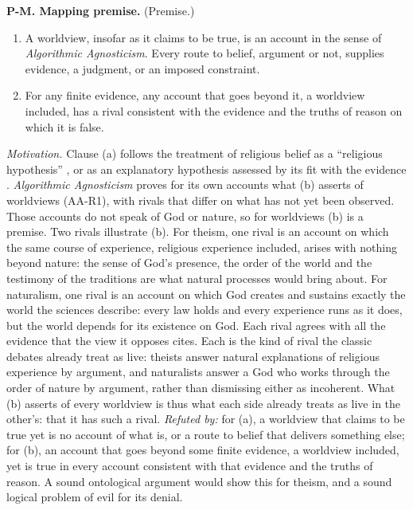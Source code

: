 \medskip\noindent\textbf{P-M. Mapping premise.}\label{item:PM}
(Premise.)
\begin{enumerate}[label=(\alph*)]
  \item A worldview, insofar as it claims to be true, is an account in the sense of
        \emph{Algorithmic Agnosticism}. Every route to belief, argument or not, supplies evidence, a judgment, or an
        imposed constraint.
  \item For any finite evidence, any account that goes beyond it, a worldview included, has a
        rival consistent with the evidence and the truths of reason on which it is false.
\end{enumerate}
\emph{Motivation.} Clause (a) follows the treatment of religious belief as a ``religious
hypothesis'' \citep[§X]{james1896}, or as an explanatory hypothesis assessed by its fit with the
evidence \citep{swinburne2004}. \emph{Algorithmic Agnosticism} proves for its own accounts what (b) asserts of
worldviews (AA-R1), with rivals that differ on what has not yet been observed. Those accounts do
not speak of God or nature, so for worldviews (b) is a premise.
Two rivals illustrate (b). For theism, one rival is an account on which the same course of
experience, religious experience included, arises with nothing beyond nature: the sense of God's
presence, the order of the world and the testimony of the traditions are what natural processes
would bring about. For naturalism, one rival is an account on which God creates and sustains
exactly the world the sciences describe: every law holds and every experience runs as it does,
but the world depends for its existence on God. Each rival agrees with all the evidence that the
view it opposes cites. Each is the kind of rival the classic debates already treat as live: theists answer
natural explanations of religious experience by argument, and naturalists answer a God who works
through the order of nature by argument, rather than dismissing either as incoherent. What (b)
asserts of every worldview is thus what each side already treats as live in the other's: that it
has such a rival.
\emph{Refuted by:} for (a), a worldview that claims to be true yet is no account of what is, or a
route to belief that delivers something else; for (b), an account that goes beyond some finite evidence, a worldview included, yet is
true in every account consistent with that evidence and the truths of reason. A sound ontological
argument would show this for theism, and a sound logical problem of evil for its denial.

